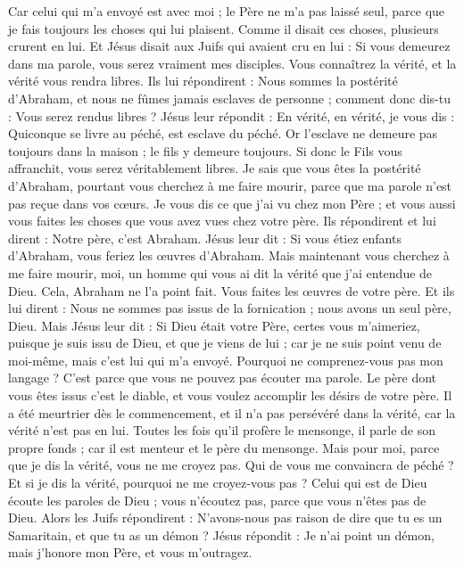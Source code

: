 \begin{multicols}{2}
Car celui qui m'a envoyé est avec moi ; le Père ne m'a pas laissé seul, parce que je fais toujours les choses qui lui plaisent.
Comme il disait ces choses, plusieurs crurent en lui.
Et Jésus disait aux Juifs qui avaient cru en lui : Si vous demeurez dans ma parole, vous serez vraiment mes disciples.
Vous connaîtrez la vérité, et la vérité vous rendra libres.
Ils lui répondirent : Nous sommes la postérité d'Abraham, et nous ne fûmes jamais esclaves de personne ; comment donc dis-tu : Vous serez rendus libres ?
Jésus leur répondit : En vérité, en vérité, je vous dis : Quiconque se livre au péché, est esclave du péché.
Or l'esclave ne demeure pas toujours dans la maison ; le fils y demeure toujours.
Si donc le Fils vous affranchit, vous serez véritablement libres.
Je sais que vous êtes la postérité d'Abraham, pourtant vous cherchez à me faire mourir, parce que ma parole n'est pas reçue dans vos cœurs.
Je vous dis ce que j'ai vu chez mon Père ; et vous aussi vous faites les choses que vous avez vues chez votre père.
Ils répondirent et lui dirent : Notre père, c'est Abraham. Jésus leur dit : Si vous étiez enfants d'Abraham, vous feriez les œuvres d'Abraham.
Mais maintenant vous cherchez à me faire mourir, moi, un homme qui vous ai dit la vérité que j'ai entendue de Dieu. Cela, Abraham ne l'a point fait.
Vous faites les œuvres de votre père. Et ils lui dirent : Nous ne sommes pas issus de la fornication ; nous avons un seul père, Dieu.
Mais Jésus leur dit : Si Dieu était votre Père, certes vous m'aimeriez, puisque je suis issu de Dieu, et que je viens de lui ; car je ne suis point venu de moi-même, mais c'est lui qui m'a envoyé.
Pourquoi ne comprenez-vous pas mon langage ? C'est parce que vous ne pouvez pas écouter ma parole.
Le père dont vous êtes issus c'est le diable, et vous voulez accomplir les désirs de votre père. Il a été meurtrier dès le commencement, et il n'a pas persévéré dans la vérité, car la vérité n'est pas en lui. Toutes les fois qu'il profère le mensonge, il parle de son propre fonds ; car il est menteur et le père du mensonge.
Mais pour moi, parce que je dis la vérité, vous ne me croyez pas.
Qui de vous me convaincra de péché ? Et si je dis la vérité, pourquoi ne me croyez-vous pas ?
Celui qui est de Dieu écoute les paroles de Dieu ; vous n'écoutez pas, parce que vous n'êtes pas de Dieu.
Alors les Juifs répondirent : N'avons-nous pas raison de dire que tu es un Samaritain, et que tu as un démon ?
Jésus répondit : Je n'ai point un démon, mais j'honore mon Père, et vous m'outragez.

\end{multicols}

